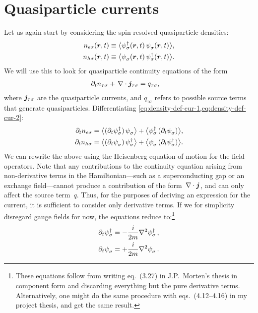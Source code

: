 \section{Quasiparticle currents}
Let us again start by considering the spin-resolved quasiparticle densities:\
\begin{align}
  \label{eq:density-def-cur-1}
  n_{e\sigma}(\B r, t) &\equiv \avg[\big]{\hc{\psi_\sigma}(\B r,t)\, \pc{\psi_\sigma}(\B r,t)}, \\
  \label{eq:density-def-cur-2}
  n_{h\sigma}(\B r, t) &\equiv \avg[\big]{\pc{\psi_\sigma}(\B r,t)\, \hc{\psi_\sigma}(\B r,t)}.
\end{align}
We will use this to look for quasiparticle continuity equations of the form
\begin{align}
  \label{eq:continuity-def}
  \partial_{t} n_{\tau\sigma} +\, \nabla\cdot\bm{j}_{\tau\sigma} &= q_{\tau\sigma}, 
\end{align}
where $\bm{j}_{\tau\sigma}$ are the quasiparticle currents, and $q_{\tau\sigma}$ refers to possible source terms that generate quasiparticles.
Differentiating \cref{eq:density-def-cur-1,eq:density-def-cur-2}:
\begin{align}
  \label{eq:density-der-cur-1}
  \p t n_{e\sigma} &=
  \avg[\big]{(\p t \hc{\psi_{\sigma}})\, \pc{\psi_{\sigma}}} +
  \avg[\big]{\hc{\psi_{\sigma}}\, (\p t \pc{\psi_{\sigma}})} , \\
  \label{eq:density-der-cur-2}
  \p t n_{h\sigma} &=
  \avg[\big]{(\p t \pc{\psi_{\sigma}})\, \hc{\psi_{\sigma}}} +
  \avg[\big]{\pc{\psi_{\sigma}}\, (\p t \hc{\psi_{\sigma}})} .
\end{align}
We can rewrite the above using the Heisenberg equation of motion for the field operators.
Note that any contributions to the continuity equation arising from non-derivative terms in the Hamiltonian---such as a superconducting gap or an exchange field---cannot produce a contribution of the form~$\nabla\cdot\bm{j}$, and can only affect the source term~$q$.
Thus, for the purposes of deriving an expression for the current, it is sufficient to consider only derivative terms.
If we for simplicity disregard gauge fields for now, the equations reduce to:\footnote{These equations follow from writing eq.~(3.27) in J.P.~Morten's thesis in component form and discarding everything but the pure derivative terms. Alternatively, one might do the same procedure with eqs.~(4.12--4.16) in my project thesis, and get the same result.}
\begin{align}
  \p t \hc{\psi_\sigma} &= -\frac{i}{2m} \nabla^2\hc{\psi_\sigma}\,, \\
  \p t \pc{\psi_\sigma} &= +\frac{i}{2m} \nabla^2\pc{\psi_\sigma}\,.
\end{align}
